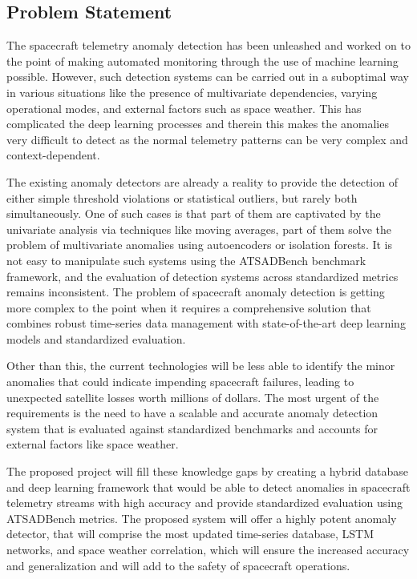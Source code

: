 \documentclass[conference]{IEEEtran}
\begin{document}
\subsection{Problem Statement}

The spacecraft telemetry anomaly detection has been unleashed and worked on to the point of making automated monitoring through the use of machine learning possible. However, such detection systems can be carried out in a suboptimal way in various situations like the presence of multivariate dependencies, varying operational modes, and external factors such as space weather. This has complicated the deep learning processes and therein this makes the anomalies very difficult to detect as the normal telemetry patterns can be very complex and context-dependent.

The existing anomaly detectors are already a reality to provide the detection of either simple threshold violations or statistical outliers, but rarely both simultaneously. One of such cases is that part of them are captivated by the univariate analysis via techniques like moving averages, part of them solve the problem of multivariate anomalies using autoencoders or isolation forests. It is not easy to manipulate such systems using the ATSADBench benchmark framework, and the evaluation of detection systems across standardized metrics remains inconsistent. The problem of spacecraft anomaly detection is getting more complex to the point when it requires a comprehensive solution that combines robust time-series data management with state-of-the-art deep learning models and standardized evaluation.

Other than this, the current technologies will be less able to identify the minor anomalies that could indicate impending spacecraft failures, leading to unexpected satellite losses worth millions of dollars. The most urgent of the requirements is the need to have a scalable and accurate anomaly detection system that is evaluated against standardized benchmarks and accounts for external factors like space weather.

The proposed project will fill these knowledge gaps by creating a hybrid database and deep learning framework that would be able to detect anomalies in spacecraft telemetry streams with high accuracy and provide standardized evaluation using ATSADBench metrics. The proposed system will offer a highly potent anomaly detector, that will comprise the most updated time-series database, LSTM networks, and space weather correlation, which will ensure the increased accuracy and generalization and will add to the safety of spacecraft operations.
\end{document}
